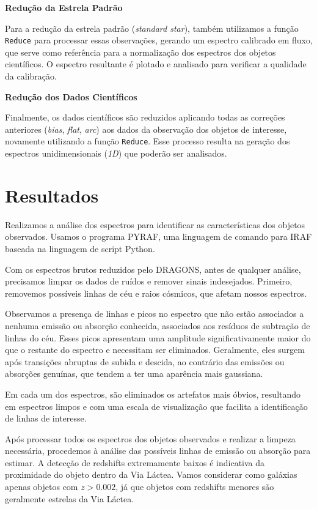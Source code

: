 \textbf{Redução da Estrela Padrão}

Para a redução da estrela padrão (\textit{standard star}), também utilizamos a função \verb|Reduce| para processar essas observações, gerando um espectro calibrado em fluxo, que serve como referência para a normalização dos espectros dos objetos científicos. O espectro resultante é plotado e analisado para verificar a qualidade da calibração.

\textbf{Redução dos Dados Científicos}

Finalmente, os dados científicos são reduzidos aplicando todas as correções anteriores (\textit{bias}, \textit{flat}, \textit{arc}) aos dados da observação dos objetos de interesse, novamente utilizando a função \verb|Reduce|. Esse processo resulta na geração dos espectros unidimensionais (\textit{1D}) que poderão ser analisados.

\section{Resultados}\label{sec:resultados}
Realizamos a análise dos espectros para identificar as características dos objetos observados. Usamos o programa PYRAF, uma linguagem de comando para IRAF baseada na linguagem de script Python.

Com os espectros brutos reduzidos pelo DRAGONS, antes de qualquer análise, precisamos limpar os dados de ruídos e remover sinais indesejados. Primeiro, removemos possíveis linhas de céu e raios cósmicos, que afetam nossos espectros. 

Observamos a presença de linhas e picos no espectro que não estão associados a nenhuma emissão ou absorção conhecida, associados aos resíduos de subtração de linhas do céu. Esses picos apresentam uma amplitude significativamente maior do que o restante do espectro e necessitam ser eliminados. Geralmente, eles surgem após transições abruptas de subida e descida, ao contrário das emissões ou absorções genuínas, que tendem a ter uma aparência mais gaussiana.

Em cada um dos espectros, são eliminados os artefatos mais óbvios, resultando em espectros limpos e com uma escala de visualização que facilita a identificação de linhas de interesse.

Após processar todos os espectros dos objetos observados e realizar a limpeza necessária, procedemos à análise das possíveis linhas de emissão ou absorção para estimar. A detecção de redshifts extremamente baixos é indicativa da proximidade do objeto dentro da Via Láctea. Vamos considerar como galáxias apenas objetos com $z > 0.002$, já que objetos com redshifts menores são geralmente estrelas da Via Láctea.

